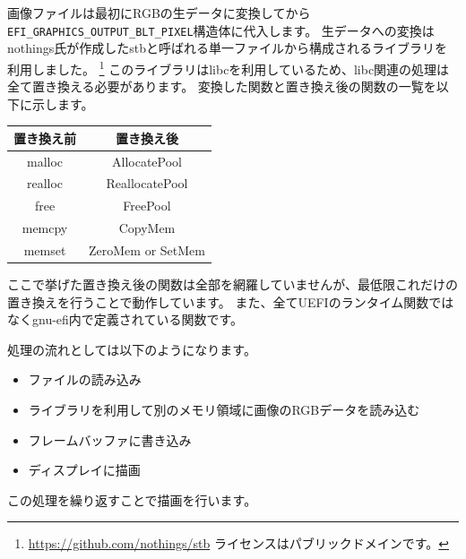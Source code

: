 \documentclass[10pt, b5paper, openany]{ltjsbook}
\begin{document}
画像ファイルは最初にRGBの生データに変換してから\verb+EFI_GRAPHICS_OUTPUT_BLT_PIXEL+構造体に代入します。
生データへの変換はnothings氏が作成したstbと呼ばれる単一ファイルから構成されるライブラリを利用しました。
\footnote{\url{https://github.com/nothings/stb} ライセンスはパブリックドメインです。}
このライブラリはlibcを利用しているため、libc関連の処理は全て置き換える必要があります。
変換した関数と置き換え後の関数の一覧を以下に示します。
\begin{table}[H]
    \centering
    \begin{tabular}{|c|c|}
        \hline
        置き換え前 & 置き換え後 \\
        \hline
        malloc & AllocatePool \\
        realloc & ReallocatePool \\
        free & FreePool \\
        memcpy & CopyMem \\
        memset & ZeroMem or SetMem \\
        \hline
    \end{tabular}
    \label{tb:function}
\end{table}
ここで挙げた置き換え後の関数は全部を網羅していませんが、最低限これだけの置き換えを行うことで動作しています。
また、全てUEFIのランタイム関数ではなくgnu-efi内で定義されている関数です。

処理の流れとしては以下のようになります。
\begin{itemize}
    \item ファイルの読み込み
    \item ライブラリを利用して別のメモリ領域に画像のRGBデータを読み込む
    \item フレームバッファに書き込み
    \item ディスプレイに描画
\end{itemize}
この処理を繰り返すことで描画を行います。
\end{document}
